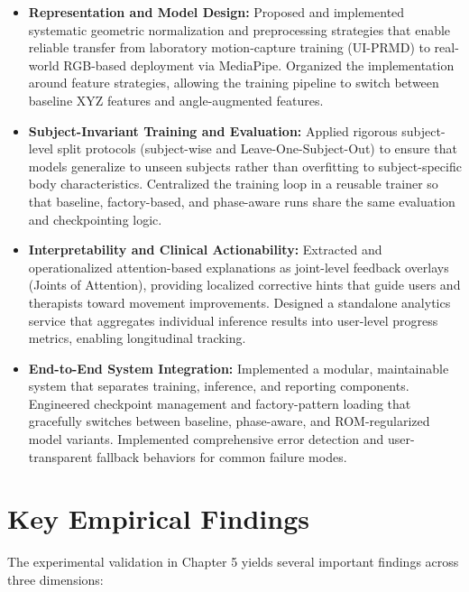 \begin{itemize}
    \item \textbf{Representation and Model Design:} Proposed and implemented systematic geometric normalization and preprocessing strategies that enable reliable transfer from laboratory motion-capture training (UI-PRMD) to real-world RGB-based deployment via MediaPipe. Organized the implementation around feature strategies, allowing the training pipeline to switch between baseline XYZ features and angle-augmented features.
    
    \item \textbf{Subject-Invariant Training and Evaluation:} Applied rigorous subject-level split protocols (subject-wise and Leave-One-Subject-Out) to ensure that models generalize to unseen subjects rather than overfitting to subject-specific body characteristics. Centralized the training loop in a reusable trainer so that baseline, factory-based, and phase-aware runs share the same evaluation and checkpointing logic.
    
    \item \textbf{Interpretability and Clinical Actionability:} Extracted and operationalized attention-based explanations as joint-level feedback overlays (Joints of Attention), providing localized corrective hints that guide users and therapists toward movement improvements. Designed a standalone analytics service that aggregates individual inference results into user-level progress metrics, enabling longitudinal tracking.
    
    \item \textbf{End-to-End System Integration:} Implemented a modular, maintainable system that separates training, inference, and reporting components. Engineered checkpoint management and factory-pattern loading that gracefully switches between baseline, phase-aware, and ROM-regularized model variants. Implemented comprehensive error detection and user-transparent fallback behaviors for common failure modes.
\end{itemize}

\section{Key Empirical Findings}
The experimental validation in Chapter 5 yields several important findings across three dimensions:

